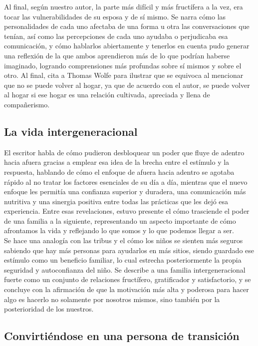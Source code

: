 \documentclass[onecolumn]{article} %
\begin{document}
	Al final, según nuestro autor, la parte más difícil y más fructífera a la vez, era tocar las vulnerabilidades de su esposa y de sí mismo. Se narra cómo las personalidades de cada uno afectaba de una forma u otra las conversaciones que tenían, así como las percepciones de cada uno ayudaba o perjudicaba esa comunicación, y cómo hablarlos abiertamente y tenerlos en cuenta pudo generar una reflexión de la que ambos aprendieron más de lo que podrían haberse imaginado, logrando comprensiones más profundas sobre sí mismos y sobre el otro. Al final, cita a Thomas Wolfe para ilustrar que se equivoca al mencionar que no se puede volver al hogar, ya que de acuerdo con el autor, se puede volver al hogar si ese hogar es una relación cultivada, apreciada y llena de compañerismo.
	
	\subsection{La vida intergeneracional}
	
	El escritor habla de cómo pudieron desbloquear un poder que fluye de adentro hacia afuera gracias a emplear esa idea de la brecha entre el estímulo y la respuesta, hablando de cómo el enfoque de afuera hacia adentro se agotaba rápido al no tratar los factores esenciales de su día a día, mientras que el nuevo enfoque les permitía una confianza superior y duradera, una comunicación más nutritiva y una sinergia positiva entre todas las prácticas que les dejó esa experiencia. Entre esas revelaciones, estuvo presente el cómo trasciende el poder de una familia a la siguiente, representando un aspecto importante de cómo afrontamos la vida y reflejando lo que somos y lo que podemos llegar a ser.\\
	
	Se hace una analogía con las tribus y el cómo los niños se sienten más seguros sabiendo que hay más personas para ayudarlos en más sitios, siendo guardado ese estímulo como un beneficio familiar, lo cual estrecha posteriormente la propia seguridad y autoconfianza del niño. Se describe a una familia intergeneracional fuerte como un conjunto de relaciones fructífero, gratificador y satisfactorio, y se concluye con la afirmación de que la motivación más alta y poderosa para hacer algo es hacerlo no solamente por nosotros mismos, sino también por la posterioridad de los nuestros.
	
	\subsection{Convirtiéndose en una persona de transición}
	
\end{document}
